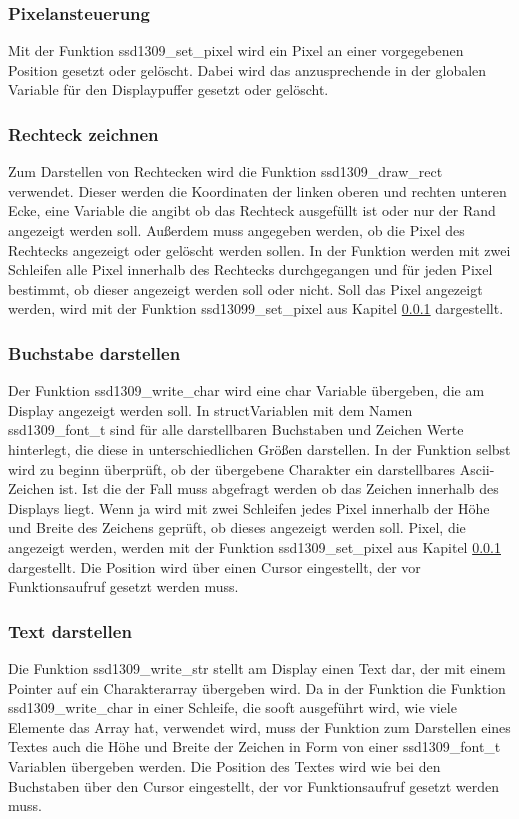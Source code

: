 \subsubsection{Pixelansteuerung}\label{sec:OLEDPixel}
Mit der Funktion \glqq ssd1309\_set\_pixel\grqq{} wird ein Pixel an einer vorgegebenen Position gesetzt oder gelöscht. Dabei wird das anzusprechende in der globalen Variable für den Displaypuffer gesetzt oder gelöscht.
\subsubsection{Rechteck zeichnen}\label{sec:OLEDRect}
Zum Darstellen von Rechtecken wird die Funktion \glqq ssd1309\_draw\_rect\grqq{} verwendet. Dieser werden die Koordinaten der linken oberen und rechten unteren Ecke, eine Variable die angibt ob das Rechteck ausgefüllt ist oder nur der Rand angezeigt werden soll. Außerdem muss angegeben werden, ob die Pixel des Rechtecks angezeigt oder gelöscht werden sollen. In der Funktion werden mit zwei Schleifen alle Pixel innerhalb des Rechtecks durchgegangen und für jeden Pixel bestimmt, ob dieser angezeigt werden soll oder nicht. Soll das Pixel angezeigt werden, wird mit der Funktion \glqq ssd13099\_set\_pixel\grqq{} aus Kapitel \ref{sec:OLEDPixel} dargestellt.
\subsubsection{Buchstabe darstellen}\label{sec:OLEDBuchstabe}
Der Funktion \glqq ssd1309\_write\_char\grqq{} wird eine char Variable übergeben, die am Display angezeigt werden soll. In \glqq struct\grqq Variablen mit dem Namen \glqq ssd1309\_font\_t\grqq{} sind für alle darstellbaren Buchstaben und Zeichen Werte hinterlegt, die diese in unterschiedlichen Größen darstellen. In der Funktion selbst wird zu beginn überprüft, ob der übergebene Charakter ein darstellbares Ascii-Zeichen ist. Ist die der Fall muss abgefragt werden ob das Zeichen innerhalb des Displays liegt. Wenn ja wird mit zwei Schleifen jedes Pixel innerhalb der Höhe und Breite des Zeichens geprüft, ob dieses angezeigt werden soll. Pixel, die angezeigt werden, werden mit der Funktion \glqq ssd1309\_set\_pixel\grqq{} aus Kapitel \ref{sec:OLEDPixel} dargestellt. Die Position wird über einen Cursor eingestellt, der vor Funktionsaufruf gesetzt werden muss.
\subsubsection{Text darstellen}\label{sec:OLEDText}
Die Funktion \glqq ssd1309\_write\_str\grqq{} stellt am Display einen Text dar, der mit einem Pointer auf ein Charakterarray übergeben wird. Da in der Funktion die Funktion \glqq ssd1309\_write\_char\grqq{} in einer Schleife, die sooft ausgeführt wird, wie viele Elemente das Array hat, verwendet wird, muss der Funktion zum Darstellen eines Textes auch die Höhe und Breite der Zeichen in Form von einer \glqq ssd1309\_font\_t\grqq{} Variablen übergeben werden. Die Position des Textes wird wie bei den Buchstaben über den Cursor eingestellt, der vor Funktionsaufruf gesetzt werden muss.
